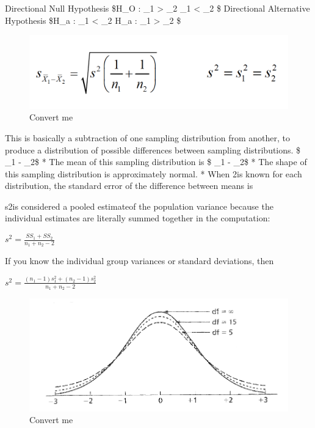 \documentclass[]{book}
\theoremstyle{definition}
\theoremstyle{definition}
\theoremstyle{definition}
\theoremstyle{remark}
\begin{document}
Directional Null Hypothesis \$H\_O : \mu\_1 \textgreater{} \mu\_2
\textbar{} \mu\_1 \textless{} \mu\_2 \$ Directional Alternative
Hypothesis \$H\_a : \mu\_1 \textless{} \mu\_2 \textbar{} H\_a : \mu\_1
\textgreater{} \mu\_2 \$

\begin{figure}
\centering
\includegraphics{img/hickssampling11.png}
\caption{Convert me}
\end{figure}

This is basically a subtraction of one sampling distribution from
another, to produce a distribution of possible differences between
sampling distributions. \$ \mu\_1 - \mu\_2\$ * The mean of this sampling
distribution is \$ \mu\_1 - \mu\_2\$ * The shape of this sampling
distribution is approximately normal. * When \sigma 2is known for each
distribution, the standard error of the difference between means is

s2is considered a pooled estimateof the population variance because the
individual estimates are literally summed together in the computation:

\(s^2 = \frac{SS_1 + SS_2}{n_1 + n_2 -2}\)

If you know the individual group variances or standard deviations, then

\(s^2 = \frac{(n_1 - 1)s_1^2 + (n_2 - 1)s_2^2}{n_1 + n_2 -2}\)

\begin{figure}
\centering
\includegraphics{img/hickssampling12.png}
\caption{Convert me}
\end{figure}
\end{document}
